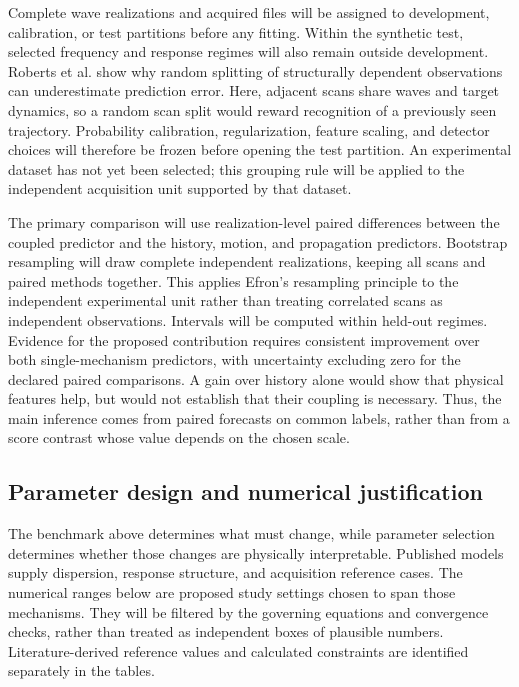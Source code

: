 \documentclass[10pt,letterpaper]{article}
\begin{document}
Complete wave realizations and acquired files will be assigned to development, calibration, or test partitions before any fitting. Within the synthetic test, selected frequency and response regimes will also remain outside development. Roberts et al. show why random splitting of structurally dependent observations can underestimate prediction error. \cite{Roberts2017CrossValidation} Here, adjacent scans share waves and target dynamics, so a random scan split would reward recognition of a previously seen trajectory. Probability calibration, regularization, feature scaling, and detector choices will therefore be frozen before opening the test partition. An experimental dataset has not yet been selected; this grouping rule will be applied to the independent acquisition unit supported by that dataset.

The primary comparison will use realization-level paired differences between the coupled predictor and the history, motion, and propagation predictors. Bootstrap resampling will draw complete independent realizations, keeping all scans and paired methods together. This applies Efron's resampling principle to the independent experimental unit rather than treating correlated scans as independent observations. \cite{Efron1979Bootstrap} Intervals will be computed within held-out regimes. Evidence for the proposed contribution requires consistent improvement over both single-mechanism predictors, with uncertainty excluding zero for the declared paired comparisons. A gain over history alone would show that physical features help, but would not establish that their coupling is necessary. Thus, the main inference comes from paired forecasts on common labels, rather than from a score contrast whose value depends on the chosen scale.

\subsection{Parameter design and numerical justification}
\label{app:parameter-design}

The benchmark above determines what must change, while parameter selection determines whether those changes are physically interpretable. Published models supply dispersion, response structure, and acquisition reference cases. The numerical ranges below are proposed study settings chosen to span those mechanisms. They will be filtered by the governing equations and convergence checks, rather than treated as independent boxes of plausible numbers. Literature-derived reference values and calculated constraints are identified separately in the tables.
\end{document}
